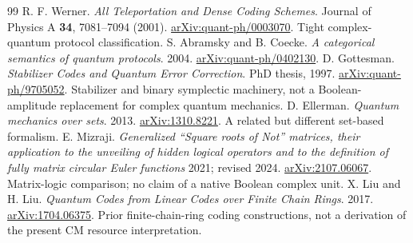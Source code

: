 \documentclass[11pt,a4paper]{article}
\theoremstyle{definition}\newtheorem{definition}[theorem]{Definition}
\begin{document}
\begin{thebibliography}{99}
 R. F. Werner. \emph{All Teleportation and Dense Coding Schemes}. Journal of Physics A \textbf{34}, 7081--7094 (2001). \href{https://arxiv.org/abs/quant-ph/0003070}{arXiv:quant-ph/0003070}. Tight complex-quantum protocol classification.
 S. Abramsky and B. Coecke. \emph{A categorical semantics of quantum protocols}. 2004. \href{https://arxiv.org/abs/quant-ph/0402130}{arXiv:quant-ph/0402130}.
 D. Gottesman. \emph{Stabilizer Codes and Quantum Error Correction}. PhD thesis, 1997. \href{https://arxiv.org/abs/quant-ph/9705052}{arXiv:quant-ph/9705052}. Stabilizer and binary symplectic machinery, not a Boolean-amplitude replacement for complex quantum mechanics.
 D. Ellerman. \emph{Quantum mechanics over sets}. 2013. \href{https://arxiv.org/abs/1310.8221}{arXiv:1310.8221}. A related but different set-based formalism.
 E. Mizraji. \emph{Generalized ``Square roots of Not'' matrices, their application to the unveiling of hidden logical operators and to the definition of fully matrix circular Euler functions} 2021; revised 2024. \href{https://arxiv.org/abs/2107.06067}{arXiv:2107.06067}. Matrix-logic comparison; no claim of a native Boolean complex unit.
 X. Liu and H. Liu. \emph{Quantum Codes from Linear Codes over Finite Chain Rings}. 2017. \href{https://arxiv.org/abs/1704.06375}{arXiv:1704.06375}. Prior finite-chain-ring coding constructions, not a derivation of the present CM resource interpretation.
\end{thebibliography}
\end{document}

